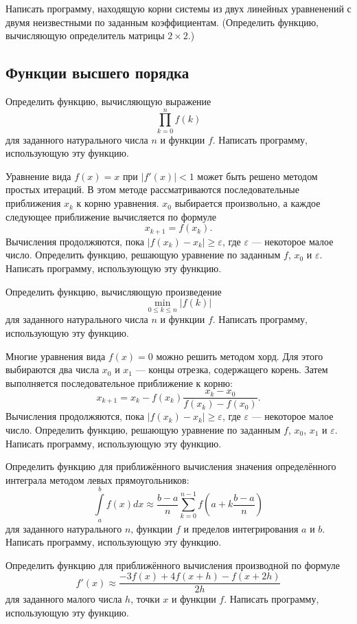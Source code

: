 \task Написать программу, находящую корни системы из двух линейных
уравненений с двумя неизвестными по заданным
коэффициентам. (Определить функцию, вычисляющую определитель матрицы
$2\times 2$.)


\subsection{Функции высшего порядка}

\task Определить функцию, вычисляющую выражение
\[
\prod_{k=0}^n f(k)
\]
для заданного натурального числа $n$ и функции $f$. Написать
программу, использующую эту функцию.

\task Уравнение вида $f(x)=x$ при $|f'(x)|<1$ может быть решено
методом простых итераций. В этом методе рассматриваются
последовательные приближения $x_k$ к корню уравнения. $x_0$ выбирается
произвольно, а каждое следующее приближение вычисляется по формуле
\[
x_{k+1} = f(x_k).
\]
Вычисления продолжяются, пока $|f(x_k) - x_k| \geqslant \varepsilon$,
где $\varepsilon$ — некоторое малое число. Определить функцию,
решающую уравнение по заданным $f$, $x_0$ и $\varepsilon$.  Написать
программу, использующую эту функцию.

\task Определить функцию, вычисляющую произведение
\[
\min_{0\leqslant k\leqslant n} \left|f(k)\right|
\]
для заданного натурального числа $n$ и функции $f$.
Написать программу, использующую эту функцию.

\task Многие уравнения вида $f(x)=0$ можно решить методом хорд. Для этого выбираются два числа $x_0$ и $x_1$ — концы отрезка, содержащего корень. Затем выполняется последовательное приближение к корню:
\[
x_{k+1} = x_k - f(x_k)\frac{x_k - x_0}{f(x_k) - f(x_0)}.
\] 
Вычисления продолжяются, пока $|f(x_k) - x_k| \geqslant \varepsilon$,
где $\varepsilon$ — некоторое малое число. Определить функцию,
решающую уравнение по заданным $f$, $x_0$, $x_1$ и $\varepsilon$.
Написать программу, использующую эту функцию.

\task Определить функцию для приближённого вычисления значения
определённого интеграла методом левых прямоугольников:
\[
\int\limits_a^b f(x) dx \approx
\frac{b-a}{n}\sum_{k=0}^{n-1} f \left(a + k\frac{b-a}{n}\right)
\]
для заданного натурального $n$, функции $f$ и пределов интегрирования
$a$ и $b$. Написать программу, использующую эту функцию.

\task Определить функцию для приближённого вычисления производной по
формуле
\[
f'(x) \approx \frac{-3f(x) + 4f(x+h) - f(x+2h)}{2h}
\]
для заданного малого числа $h$, точки $x$ и функции $f.$ Написать
программу, использующую эту функцию.

